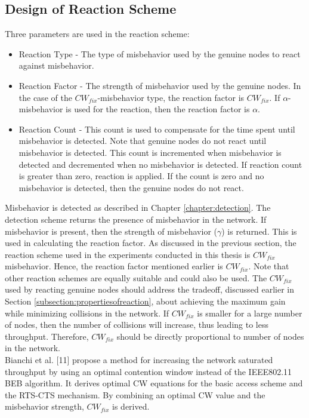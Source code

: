 \documentclass[12pt,letterpaper,english]{article}
\begin{document}
\subsection{Design of Reaction Scheme} 
\label{subsection:reactiondesign} 
\indent Three parameters are used in the reaction scheme:
\begin{itemize}
\item Reaction Type - The type of misbehavior used by the genuine nodes to react against misbehavior.
\item Reaction Factor - The strength of misbehavior used by the genuine nodes. In the case of the $CW_{fix}$-misbehavior type, the reaction factor is $CW_{fix}$. If $\alpha$-misbehavior is used for the reaction, then the reaction factor is $\alpha$.
\item Reaction Count - This count is used to compensate for the time spent until misbehavior is detected. Note that genuine nodes do not react until misbehavior is detected. This count is incremented when misbehavior is detected and decremented when no misbehavior is detected. If reaction count is greater than zero, reaction is applied. If the count is zero and no misbehavior is detected, then the genuine nodes do not react. 
\end{itemize}
\indent Misbehavior is detected as described in Chapter \ref{chapter:detection}. The detection scheme returns the presence of misbehavior in the network. If misbehavior is present, then the strength of misbehavior ($\gamma$) is returned. This is used in calculating the reaction factor.
As discussed in the previous section, the reaction scheme used in the experiments conducted in this thesis is $CW_{fix}$ misbehavior. Hence, the reaction factor mentioned earlier is $CW_{fix}$. Note that other reaction schemes are equally suitable and could also be used. The $CW_{fix}$ used by reacting genuine nodes should address the tradeoff, discussed earlier in Section \ref{subsection:propertiesofreaction}, about achieving the maximum gain while minimizing collisions in the network. If $CW_{fix}$ is smaller for a large number of nodes, then the number of collisions will increase, thus leading to less throughput. Therefore, $CW_{fix}$ should be directly proportional to number of nodes in the network.
\\
\indent Bianchi et al. 
[11] 
propose a method for increasing the network saturated throughput by using an optimal contention window instead of the IEEE802.11 BEB algorithm. It derives optimal CW equations for the basic access scheme and the RTS-CTS mechanism. By combining an optimal CW value and the misbehavior strength, $CW_{fix}$ is derived.
\end{document}
